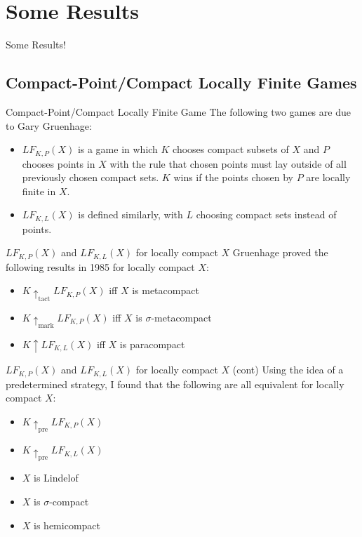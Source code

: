 \documentclass{beamer}
\newcommand{\win}{\uparrow}
\newcommand{\prewin}{\uparrow_{\text{pre}}}
\newcommand{\markwin}{\uparrow_{\text{mark}}}
\newcommand{\tactwin}{\uparrow_{\text{tact}}}
\newcommand{\lfkpgame}[1]{LF_{K,P}(#1)}
\newcommand{\lfklgame}[1]{LF_{K,L}(#1)}
\begin{document}
\section{Some Results}

\begin{frame}
\centerline{Some Results!}
\end{frame}

\subsection[Compact-Point/Compact Locally Finite Games]{Compact-Point/Compact Locally Finite Games}

\begin{frame}{Compact-Point/Compact Locally Finite Game}
The following two games are due to Gary Gruenhage:
\begin{itemize}
\item $\lfkpgame{X}$ is a game in which $K$ chooses compact subsets of $X$ and $P$ chooses points in $X$ with the rule that chosen points must lay outside of all previously chosen compact sets. $K$ wins if the points chosen by $P$ are locally finite in $X$.
\pause
\item $\lfklgame{X}$ is defined similarly, with $L$ choosing compact sets instead of points.
\end{itemize}
\end{frame}

\begin{frame}{$\lfkpgame{X}$ and $\lfklgame{X}$ for locally compact $X$}
Gruenhage proved the following results in 1985 for locally compact $X$:
\pause
\begin{itemize}
\item $K\tactwin\lfkpgame{X}$ iff $X$ is metacompact
\pause
\item $K\markwin\lfkpgame{X}$ iff $X$ is $\sigma$-metacompact
\pause
\item $K\win\lfklgame{X}$ iff $X$ is paracompact
\end{itemize}
\end{frame}

\begin{frame}{$\lfkpgame{X}$ and $\lfklgame{X}$ for locally compact $X$ (cont)}
Using the idea of a predetermined strategy, I found that the following are all equivalent for locally compact $X$:
\pause
\begin{itemize}
\item $K\prewin\lfkpgame{X}$
\item $K\prewin\lfklgame{X}$
\pause
\item $X$ is Lindelof
\pause
\item $X$ is $\sigma$-compact
\pause
\item $X$ is hemicompact
\end{itemize}
\end{frame}
\end{document}
